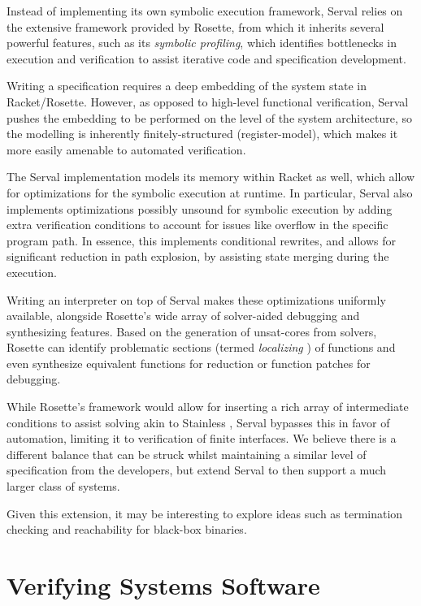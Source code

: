 \documentclass[11pt,a4paper,runningheads]{llncs}
\newcommand{\serval}{Serval\xspace}
\newcommand{\racket}{\textsf{Racket}\xspace}
\newcommand{\rosette}{\textsf{Rosette}\xspace}
\begin{document}
Instead of implementing its own symbolic execution framework, \serval relies on
the extensive framework provided by \rosette, from which it inherits several
powerful features, such as its \emph{symbolic profiling}, which identifies
bottlenecks in execution and verification to assist iterative code and
specification development.

Writing a specification requires a deep embedding of the system state in
\racket/\rosette. However, as opposed to high-level functional verification,
\serval pushes the embedding to be performed on the level of the system
architecture, so the modelling is inherently finitely-structured
(register-model), which makes it more easily amenable to automated verification. 

The \serval implementation models its memory within \racket as well, which allow
for optimizations for the symbolic execution at runtime. In particular, \serval
also implements optimizations possibly unsound for symbolic execution by adding
extra verification conditions to account for issues like overflow in the
specific program path. In essence, this implements conditional rewrites, and
allows for significant reduction in path explosion, by assisting state merging
during the execution. 

Writing an interpreter on top of \serval makes these optimizations uniformly
available, alongside \rosette's wide array of solver-aided debugging and
synthesizing features. Based on the generation of unsat-cores from solvers,
\rosette can identify problematic sections (termed \emph{localizing}
\cite{rosette}) of functions and even synthesize equivalent functions for
reduction or function patches for debugging.

While \rosette's framework would allow for inserting a rich array of
intermediate conditions to assist solving akin to Stainless \cite{stainless},
\serval bypasses this in favor of automation, limiting it to verification of
finite interfaces. We believe there is a different balance that can be struck
whilst maintaining a similar level of specification from the developers, but
extend \serval to then support a much larger class of systems.

Given this extension, it may be interesting to explore ideas such as termination
checking and reachability for black-box binaries.


\section{Verifying Systems Software}
\label{system}
\end{document}
